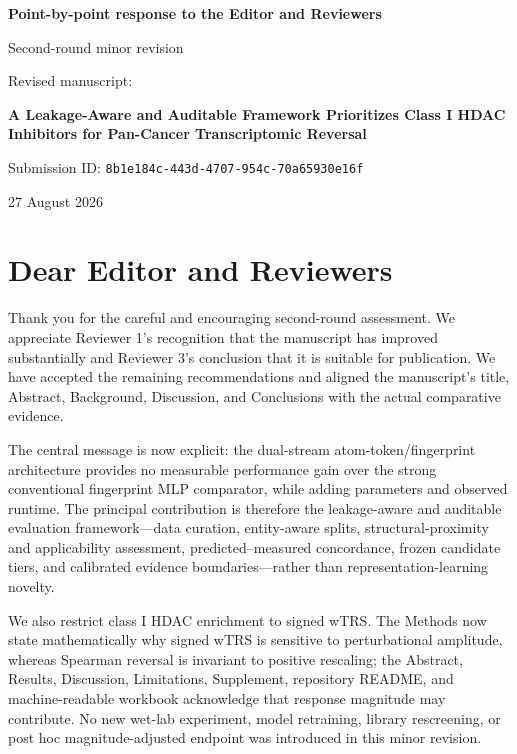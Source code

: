 \documentclass[10pt]{article}
\begin{document}
\begin{center}
{\Large\bfseries Point-by-point response to the Editor and Reviewers}\par
\vspace{0.2em}
{\large Second-round minor revision}\par
\vspace{0.5em}
{\large Revised manuscript:}\par
\textbf{A Leakage-Aware and Auditable Framework Prioritizes Class I HDAC Inhibitors for Pan-Cancer Transcriptomic Reversal}\par
\vspace{0.35em}
Submission ID: \texttt{8b1e184c-443d-4707-954c-70a65930e16f}\par
27 August 2026
\end{center}

\section*{Dear Editor and Reviewers}

Thank you for the careful and encouraging second-round assessment. We appreciate Reviewer 1's recognition that the manuscript has improved substantially and Reviewer 3's conclusion that it is suitable for publication. We have accepted the remaining recommendations and aligned the manuscript's title, Abstract, Background, Discussion, and Conclusions with the actual comparative evidence.

The central message is now explicit: the dual-stream atom-token/fingerprint architecture provides no measurable performance gain over the strong conventional fingerprint MLP comparator, while adding parameters and observed runtime. The principal contribution is therefore the leakage-aware and auditable evaluation framework---data curation, entity-aware splits, structural-proximity and applicability assessment, predicted--measured concordance, frozen candidate tiers, and calibrated evidence boundaries---rather than representation-learning novelty.

We also restrict class I HDAC enrichment to signed wTRS. The Methods now state mathematically why signed wTRS is sensitive to perturbational amplitude, whereas Spearman reversal is invariant to positive rescaling; the Abstract, Results, Discussion, Limitations, Supplement, repository README, and machine-readable workbook acknowledge that response magnitude may contribute. No new wet-lab experiment, model retraining, library rescreening, or post hoc magnitude-adjusted endpoint was introduced in this minor revision.
\end{document}
